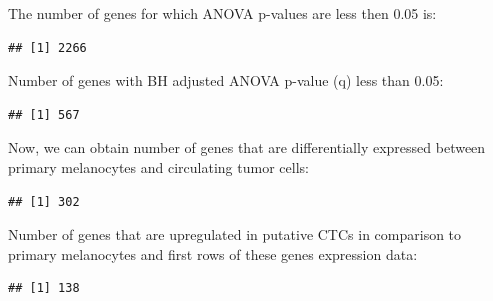 \documentclass[]{article}
\newenvironment{Shaded}{\begin{snugshade}}{\end{snugshade}}
\newcommand{\KeywordTok}[1]{\textcolor[rgb]{0.13,0.29,0.53}{\textbf{#1}}}
\newcommand{\StringTok}[1]{\textcolor[rgb]{0.31,0.60,0.02}{#1}}
\newcommand{\OperatorTok}[1]{\textcolor[rgb]{0.81,0.36,0.00}{\textbf{#1}}}
\newcommand{\NormalTok}[1]{#1}
\begin{document}
The number of genes for which ANOVA p-values are less then 0.05 is:

\begin{verbatim}
## [1] 2266
\end{verbatim}

Number of genes with BH adjusted ANOVA p-value (q) less than 0.05:

\begin{verbatim}
## [1] 567
\end{verbatim}

Now, we can obtain number of genes that are differentially expressed
between primary melanocytes and circulating tumor cells:

\begin{Shaded}
\end{Shaded}

\begin{verbatim}
## [1] 302
\end{verbatim}

Number of genes that are upregulated in putative CTCs in comparison to
primary melanocytes and first rows of these genes expression data:

\begin{verbatim}
## [1] 138
\end{verbatim}
\end{document}
